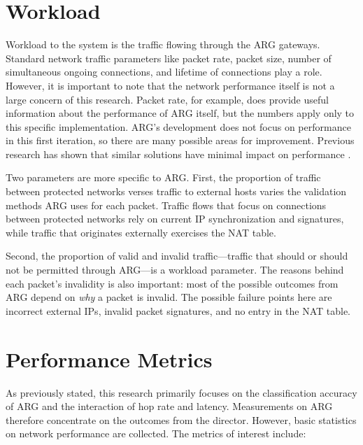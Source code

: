 \section{Workload}
\label{sec:workload}
\par Workload to the system is the traffic flowing through the \ac{ARG} gateways. Standard network traffic parameters like packet rate, packet size, number of simultaneous ongoing connections, and lifetime of connections play a role. However, it is important to note that the network performance itself is not a large concern of this research. Packet rate, for example, does provide useful information about the performance of \ac{ARG} itself, but the numbers apply only to this specific implementation. \ac{ARG}'s development does not focus on performance in this first iteration, so there are many possible areas for improvement. Previous research has shown that similar solutions have minimal impact on performance \cite{NAH}. 

\par Two parameters are more specific to \ac{ARG}. First, the proportion of traffic between protected networks verses traffic to external hosts varies the validation methods \ac{ARG} uses for each packet. Traffic flows that focus on connections between protected networks rely on current \ac{IP} synchronization and signatures, while traffic that originates externally exercises the \ac{NAT} table.

\par Second, the proportion of valid and invalid traffic---traffic that should or should not be permitted through \ac{ARG}---is a workload parameter. The reasons behind each packet's invalidity is also important: most of the possible outcomes from \ac{ARG} depend on \textit{why} a packet is invalid. The possible failure points here are incorrect external \acp{IP}, invalid packet signatures, and no entry in the \ac{NAT} table.

\section{Performance Metrics}
\label{sec:metrics}
\par As previously stated, this research primarily focuses on the classification accuracy of \ac{ARG} and the interaction of hop rate and latency. Measurements on \ac{ARG} therefore concentrate on the outcomes from the director. However, basic statistics on network performance are collected. The metrics of interest include:

